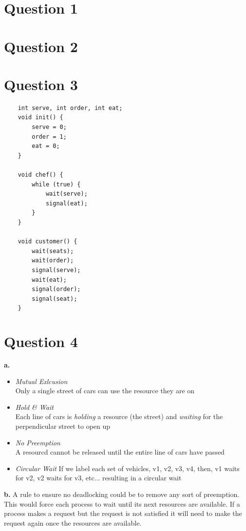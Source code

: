 \documentclass[11pt]{article}
\begin{document}
\maketitle

\section*{Question 1}

\section*{Question 2}

\section*{Question 3}
\begin{verbatim}
    int serve, int order, int eat;
    void init() {
        serve = 0;
        order = 1;
        eat = 0;
    }
    
    void chef() {
        while (true) {
            wait(serve);
            signal(eat);
        }
    }
    
    void customer() {
        wait(seats);
        wait(order); 
        signal(serve);
        wait(eat); 
        signal(order);
        signal(seat); 
    }
\end{verbatim}
\section*{Question 4}
\textbf{a.}\\
\begin{itemize}
\item \emph{Mutual Exlcusion}\\
    Only a single street of cars can use the resource they are on
\item \emph{Hold \& Wait}\\
    Each line of cars is \emph{holding} a resource (the street)
    and \emph{waiting} for the perpendicular street to open up 
\item \emph{No Preemption}\\
    A resourcd cannot be released until the entire line of cars 
    have passed
\item \emph{Circular Wait}
    If we label each set of vehicles, v1, v2, v3, v4, then, 
    v1 waits for v2, v2 waits for v3, etc... resulting in a circular 
    wait
\end{itemize}
\textbf{b.}
A rule to ensure no deadlocking could be to remove any sort 
of preemption. This would force each process to wait until 
its next resources are available. If a process makes a request 
but the request is not satisfied it will need to make the request 
again once the resources are available. 
\end{document}
